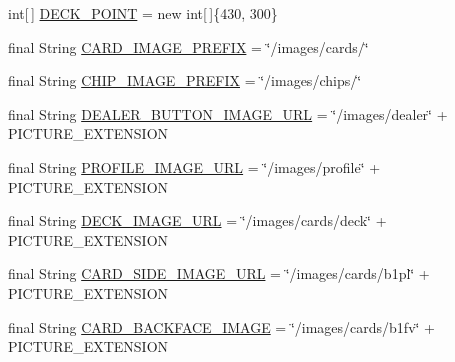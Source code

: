 \begin{DoxyCompactItemize}
\item 
int\mbox{[}$\,$\mbox{]} \hyperlink{classhu_1_1elte_1_1bfw1p6_1_1poker_1_1client_1_1defaultvalues_1_1_abstract_default_values_af0a328e4d5e6fc9890a1394fb919ec3c}{D\+E\+C\+K\+\_\+\+P\+O\+I\+N\+T} = new int\mbox{[}$\,$\mbox{]}\{430, 300\}
\item 
final String \hyperlink{classhu_1_1elte_1_1bfw1p6_1_1poker_1_1client_1_1defaultvalues_1_1_abstract_default_values_a5dfe349babd4f1191de09ef2bdc3cf7c}{C\+A\+R\+D\+\_\+\+I\+M\+A\+G\+E\+\_\+\+P\+R\+E\+F\+I\+X} = \char`\"{}/images/cards/\char`\"{}
\item 
final String \hyperlink{classhu_1_1elte_1_1bfw1p6_1_1poker_1_1client_1_1defaultvalues_1_1_abstract_default_values_abf1c54c6a5c49436a54b93696b09d46c}{C\+H\+I\+P\+\_\+\+I\+M\+A\+G\+E\+\_\+\+P\+R\+E\+F\+I\+X} = \char`\"{}/images/chips/\char`\"{}
\item 
final String \hyperlink{classhu_1_1elte_1_1bfw1p6_1_1poker_1_1client_1_1defaultvalues_1_1_abstract_default_values_a67b646f564cc2b41c920154631cf4cc8}{D\+E\+A\+L\+E\+R\+\_\+\+B\+U\+T\+T\+O\+N\+\_\+\+I\+M\+A\+G\+E\+\_\+\+U\+R\+L} = \char`\"{}/images/dealer\char`\"{} + P\+I\+C\+T\+U\+R\+E\+\_\+\+E\+X\+T\+E\+N\+S\+I\+O\+N
\item 
final String \hyperlink{classhu_1_1elte_1_1bfw1p6_1_1poker_1_1client_1_1defaultvalues_1_1_abstract_default_values_a976408be51f002b433df4bff4bd0161b}{P\+R\+O\+F\+I\+L\+E\+\_\+\+I\+M\+A\+G\+E\+\_\+\+U\+R\+L} = \char`\"{}/images/profile\char`\"{} + P\+I\+C\+T\+U\+R\+E\+\_\+\+E\+X\+T\+E\+N\+S\+I\+O\+N
\item 
final String \hyperlink{classhu_1_1elte_1_1bfw1p6_1_1poker_1_1client_1_1defaultvalues_1_1_abstract_default_values_a98e76b3bb24775992f5eda0210523940}{D\+E\+C\+K\+\_\+\+I\+M\+A\+G\+E\+\_\+\+U\+R\+L} = \char`\"{}/images/cards/deck\char`\"{} + P\+I\+C\+T\+U\+R\+E\+\_\+\+E\+X\+T\+E\+N\+S\+I\+O\+N
\item 
final String \hyperlink{classhu_1_1elte_1_1bfw1p6_1_1poker_1_1client_1_1defaultvalues_1_1_abstract_default_values_a91bcb96ba7bd4bb7e7ca309a5b10876b}{C\+A\+R\+D\+\_\+\+S\+I\+D\+E\+\_\+\+I\+M\+A\+G\+E\+\_\+\+U\+R\+L} = \char`\"{}/images/cards/b1pl\char`\"{} + P\+I\+C\+T\+U\+R\+E\+\_\+\+E\+X\+T\+E\+N\+S\+I\+O\+N
\item 
final String \hyperlink{classhu_1_1elte_1_1bfw1p6_1_1poker_1_1client_1_1defaultvalues_1_1_abstract_default_values_a4ecf6068ed7c0edefb17233aef4a4a8d}{C\+A\+R\+D\+\_\+\+B\+A\+C\+K\+F\+A\+C\+E\+\_\+\+I\+M\+A\+G\+E} = \char`\"{}/images/cards/b1fv\char`\"{} + P\+I\+C\+T\+U\+R\+E\+\_\+\+E\+X\+T\+E\+N\+S\+I\+O\+N

\end{DoxyCompactItemize}
